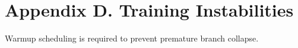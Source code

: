 \section*{Appendix D. Training Instabilities}Warmup scheduling is required to prevent premature branch collapse.
